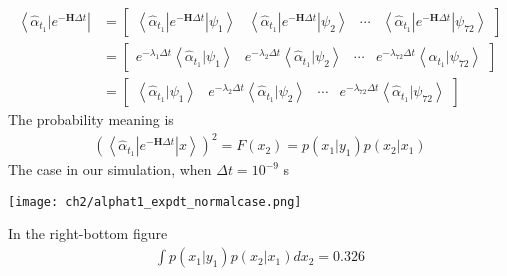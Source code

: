 \begin{definition}
\begin{align*}
        \left< \hat{\alpha}_{t_1}| e^{-\textbf{H}\Delta t} \right| &= 
        \begin{bmatrix}
                \left< \hat{\alpha}_{t_1}| e^{-\textbf{H}\Delta t} | \psi_1 \right> &
                \left< \hat{\alpha}_{t_1}| e^{-\textbf{H}\Delta t} | \psi_2 \right> & 
                \cdots &
                \left< \hat{\alpha}_{t_1}| e^{-\textbf{H}\Delta t} | \psi_{72} \right>
        \end{bmatrix}\\
        &=
        \begin{bmatrix}
                e^{-\lambda_{1}\Delta t} \left< \hat{\alpha}_{t_1} | \psi_1 \right> &
                e^{-\lambda_{2}\Delta t} \left< \hat{\alpha}_{t_1} | \psi_2 \right> & 
                \cdots &
                e^{-\lambda_{72}\Delta t} \left< \hat{\alpha}_{t_1} | \psi_{72} \right> 
        \end{bmatrix}\\ 
        &=
        \begin{bmatrix}
                \left< \hat{\alpha}_{t_1} | \psi_1 \right> &
                e^{-\lambda_{2}\Delta t} \left< \hat{\alpha}_{t_1} | \psi_2 \right> & 
                \cdots &
                e^{-\lambda_{72}\Delta t} \left< \hat{\alpha}_{t_1} | \psi_{72} \right> 
        \end{bmatrix}
\end{align*}
The probability meaning is 
\begin{align*}
        (\left< \hat{\alpha}_{t_1}| e^{-\textbf{H}\Delta t} | x \right>)^2 = F(x_2) = p(x_1|y_1) p(x_2|x_1) 
\end{align*}
The case in our simulation, when $\Delta t = 10^{-9}$ s 
\begin{center}
        \texttt{[image: ch2/alphat1\_expdt\_normalcase.png]}   
\end{center}
In the right-bottom figure
\begin{align*}
        \int p(x_1|y_1)p(x_2|x_1)dx_2 = 0.326
\end{align*}
\end{definition}

